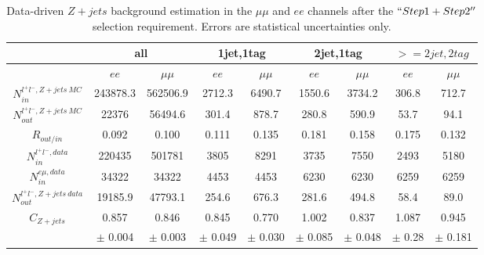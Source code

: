 \begin{table}[h]
\centering
\begin{tabular}{|c|c|c|c|c|c|c|c|c|}
\hline
                                   & \multicolumn{2}{c|}{all} & \multicolumn{2}{c|}{1jet,1tag} & \multicolumn{2}{c|}{2jet,1tag} & \multicolumn{2}{c|}{$>=2jet,2tag$} \\ \hline
                                   & $ee$       & $\mu\mu$    & $ee$         & $\mu\mu$        & $ee$         & $\mu\mu$        & $ee$           & $\mu\mu$          \\ \hline
$N^{l^{+}l^{-},Z+jets~MC}_{in} $   & 243878.3   & 562506.9    & 2712.3       & 6490.7          & 1550.6       & 3734.2          & 306.8          & 712.7             \\ \hline
$N^{l^{+}l^{-},Z+jets~MC}_{out}$   & 22376      & 56494.6     & 301.4        & 878.7           & 280.8        & 590.9           & 53.7           & 94.1              \\ \hline
$R_{out/in}$                       & 0.092      & 0.100       & 0.111        & 0.135           & 0.181        & 0.158           & 0.175          & 0.132             \\ \hline
$N^{l^{+}l^{-},data}_{in}$         & 220435     & 501781      & 3805         & 8291            & 3735         & 7550            & 2493           & 5180              \\ \hline
$N^{e\mu,data}_{in}$               & 34322      & 34322       & 4453         & 4453            & 6230         & 6230            & 6259           & 6259              \\ \hline
$N^{l^{+}l^{-},Z+jets~data}_{out}$ & 19185.9    & 47793.1     & 254.6        & 676.3           & 281.6        & 494.8           & 58.4           & 89.0              \\ \hline
$C_{Z+jets}$                       & 0.857      & 0.846       & 0.845        & 0.770           & 1.002        & 0.837           & 1.087          & 0.945             \\
                                   & $\pm$ 0.004& $\pm$ 0.003 & $\pm$ 0.049  & $\pm$ 0.030     & $\pm$ 0.085  & $\pm$ 0.048     & $\pm$ 0.28    & $\pm$ 0.181 \\ \hline
\end{tabular}
\caption{Data-driven $Z+jets$ background estimation in the $\mu\mu$ and $ee$
channels after the $``Step1+Step2''$ selection requirement. Errors are statistical uncertainties only.}
\label{tab:DY_scale}
\end{table}




